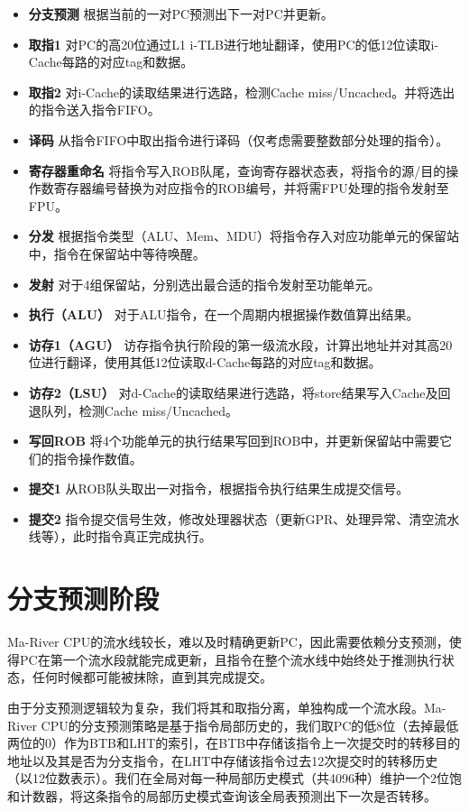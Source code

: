 \begin{itemize}
    \item \textbf{分支预测} \quad 根据当前的一对PC预测出下一对PC并更新。
    \item \textbf{取指1} \quad 对PC的高20位通过L1 i-TLB进行地址翻译，使用PC的低12位读取i-Cache每路的对应tag和数据。
    \item \textbf{取指2} \quad 对i-Cache的读取结果进行选路，检测Cache miss/Uncached。并将选出的指令送入指令FIFO。
    \item \textbf{译码} \quad 从指令FIFO中取出指令进行译码（仅考虑需要整数部分处理的指令）。
    \item \textbf{寄存器重命名} \quad 将指令写入ROB队尾，查询寄存器状态表，将指令的源/目的操作数寄存器编号替换为对应指令的ROB编号，并将需FPU处理的指令发射至FPU。
    \item \textbf{分发} \quad 根据指令类型（ALU、Mem、MDU）将指令存入对应功能单元的保留站中，指令在保留站中等待唤醒。
    \item \textbf{发射} \quad 对于4组保留站，分别选出最合适的指令发射至功能单元。
    \item \textbf{执行（ALU）} \quad 对于ALU指令，在一个周期内根据操作数值算出结果。
    \item \textbf{访存1（AGU）} \quad 访存指令执行阶段的第一级流水段，计算出地址并对其高20位进行翻译，使用其低12位读取d-Cache每路的对应tag和数据。
    \item \textbf{访存2（LSU）} \quad 对d-Cache的读取结果进行选路，将store结果写入Cache及回退队列，检测Cache miss/Uncached。
    \item \textbf{写回ROB} \quad 将4个功能单元的执行结果写回到ROB中，并更新保留站中需要它们的指令操作数值。
    \item \textbf{提交1} \quad 从ROB队头取出一对指令，根据指令执行结果生成提交信号。
    \item \textbf{提交2} \quad 指令提交信号生效，修改处理器状态（更新GPR、处理异常、清空流水线等），此时指令真正完成执行。
\end{itemize}


\section{分支预测阶段}

Ma-River CPU的流水线较长，难以及时精确更新PC，因此需要依赖分支预测，使得PC在第一个流水段就能完成更新，且指令在整个流水线中始终处于推测执行状态，任何时候都可能被抹除，直到其完成提交。

由于分支预测逻辑较为复杂，我们将其和取指分离，单独构成一个流水段。Ma-River CPU的分支预测策略是基于指令局部历史的，我们取PC的低8位（去掉最低两位的0）作为BTB和LHT的索引，在BTB中存储该指令上一次提交时的转移目的地址以及其是否为分支指令，在LHT中存储该指令过去12次提交时的转移历史（以12位数表示）。我们在全局对每一种局部历史模式（共4096种）维护一个2位饱和计数器，将这条指令的局部历史模式查询该全局表预测出下一次是否转移。

